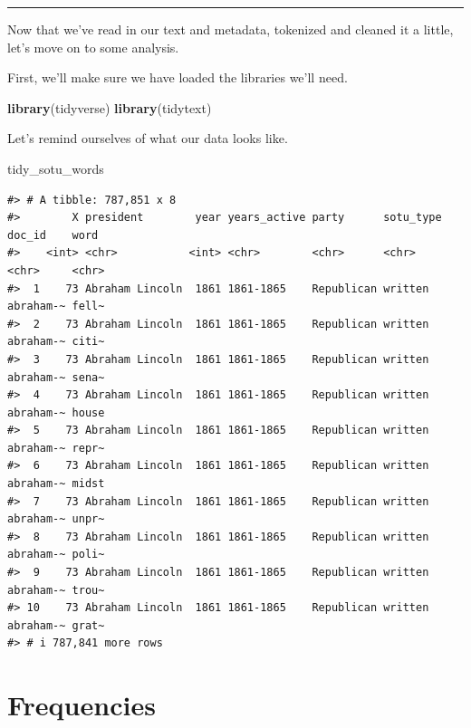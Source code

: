 \documentclass[
]{book}
\newenvironment{Shaded}{\begin{snugshade}}{\end{snugshade}}
\newcommand{\FunctionTok}[1]{\textcolor[rgb]{0.13,0.29,0.53}{\textbf{#1}}}
\newcommand{\NormalTok}[1]{#1}
\begin{document}
\begin{center}\rule{0.5\linewidth}{0.5pt}\end{center}

Now that we've read in our text and metadata, tokenized and cleaned it a little, let's move on to some analysis.

First, we'll make sure we have loaded the libraries we'll need.

\begin{Shaded}
\begin{Highlighting}[]
\FunctionTok{library}\NormalTok{(tidyverse)}
\FunctionTok{library}\NormalTok{(tidytext)}
\end{Highlighting}
\end{Shaded}

Let's remind ourselves of what our data looks like.

\begin{Shaded}
\begin{Highlighting}[]
\NormalTok{tidy\_sotu\_words}
\end{Highlighting}
\end{Shaded}

\begin{verbatim}
#> # A tibble: 787,851 x 8
#>        X president        year years_active party      sotu_type doc_id    word 
#>    <int> <chr>           <int> <chr>        <chr>      <chr>     <chr>     <chr>
#>  1    73 Abraham Lincoln  1861 1861-1865    Republican written   abraham-~ fell~
#>  2    73 Abraham Lincoln  1861 1861-1865    Republican written   abraham-~ citi~
#>  3    73 Abraham Lincoln  1861 1861-1865    Republican written   abraham-~ sena~
#>  4    73 Abraham Lincoln  1861 1861-1865    Republican written   abraham-~ house
#>  5    73 Abraham Lincoln  1861 1861-1865    Republican written   abraham-~ repr~
#>  6    73 Abraham Lincoln  1861 1861-1865    Republican written   abraham-~ midst
#>  7    73 Abraham Lincoln  1861 1861-1865    Republican written   abraham-~ unpr~
#>  8    73 Abraham Lincoln  1861 1861-1865    Republican written   abraham-~ poli~
#>  9    73 Abraham Lincoln  1861 1861-1865    Republican written   abraham-~ trou~
#> 10    73 Abraham Lincoln  1861 1861-1865    Republican written   abraham-~ grat~
#> # i 787,841 more rows
\end{verbatim}

\section{Frequencies}\label{frequencies}
\end{document}
